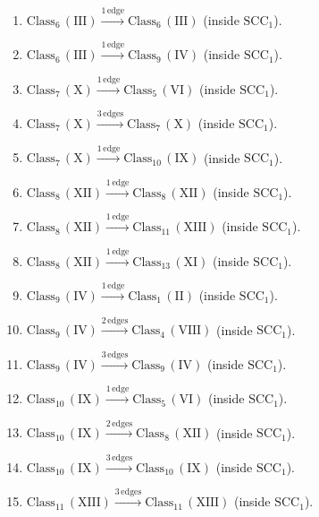 \begin{enumerate}[leftmargin=*]
\item $\mathrm{Class}_{6}\,(\mathrm{III}) \xrightarrow{1\,\mathrm{edge}} \mathrm{Class}_{6}\,(\mathrm{III})$ (inside $\mathrm{SCC}_{1}$).
\item $\mathrm{Class}_{6}\,(\mathrm{III}) \xrightarrow{1\,\mathrm{edge}} \mathrm{Class}_{9}\,(\mathrm{IV})$ (inside $\mathrm{SCC}_{1}$).
\item $\mathrm{Class}_{7}\,(\mathrm{X}) \xrightarrow{1\,\mathrm{edge}} \mathrm{Class}_{5}\,(\mathrm{VI})$ (inside $\mathrm{SCC}_{1}$).
\item $\mathrm{Class}_{7}\,(\mathrm{X}) \xrightarrow{3\,\mathrm{edges}} \mathrm{Class}_{7}\,(\mathrm{X})$ (inside $\mathrm{SCC}_{1}$).
\item $\mathrm{Class}_{7}\,(\mathrm{X}) \xrightarrow{1\,\mathrm{edge}} \mathrm{Class}_{10}\,(\mathrm{IX})$ (inside $\mathrm{SCC}_{1}$).
\item $\mathrm{Class}_{8}\,(\mathrm{XII}) \xrightarrow{1\,\mathrm{edge}} \mathrm{Class}_{8}\,(\mathrm{XII})$ (inside $\mathrm{SCC}_{1}$).
\item $\mathrm{Class}_{8}\,(\mathrm{XII}) \xrightarrow{1\,\mathrm{edge}} \mathrm{Class}_{11}\,(\mathrm{XIII})$ (inside $\mathrm{SCC}_{1}$).
\item $\mathrm{Class}_{8}\,(\mathrm{XII}) \xrightarrow{1\,\mathrm{edge}} \mathrm{Class}_{13}\,(\mathrm{XI})$ (inside $\mathrm{SCC}_{1}$).
\item $\mathrm{Class}_{9}\,(\mathrm{IV}) \xrightarrow{1\,\mathrm{edge}} \mathrm{Class}_{1}\,(\mathrm{II})$ (inside $\mathrm{SCC}_{1}$).
\item $\mathrm{Class}_{9}\,(\mathrm{IV}) \xrightarrow{2\,\mathrm{edges}} \mathrm{Class}_{4}\,(\mathrm{VIII})$ (inside $\mathrm{SCC}_{1}$).
\item $\mathrm{Class}_{9}\,(\mathrm{IV}) \xrightarrow{3\,\mathrm{edges}} \mathrm{Class}_{9}\,(\mathrm{IV})$ (inside $\mathrm{SCC}_{1}$).
\item $\mathrm{Class}_{10}\,(\mathrm{IX}) \xrightarrow{1\,\mathrm{edge}} \mathrm{Class}_{5}\,(\mathrm{VI})$ (inside $\mathrm{SCC}_{1}$).
\item $\mathrm{Class}_{10}\,(\mathrm{IX}) \xrightarrow{2\,\mathrm{edges}} \mathrm{Class}_{8}\,(\mathrm{XII})$ (inside $\mathrm{SCC}_{1}$).
\item $\mathrm{Class}_{10}\,(\mathrm{IX}) \xrightarrow{3\,\mathrm{edges}} \mathrm{Class}_{10}\,(\mathrm{IX})$ (inside $\mathrm{SCC}_{1}$).
\item $\mathrm{Class}_{11}\,(\mathrm{XIII}) \xrightarrow{3\,\mathrm{edges}} \mathrm{Class}_{11}\,(\mathrm{XIII})$ (inside $\mathrm{SCC}_{1}$).

\end{enumerate}
